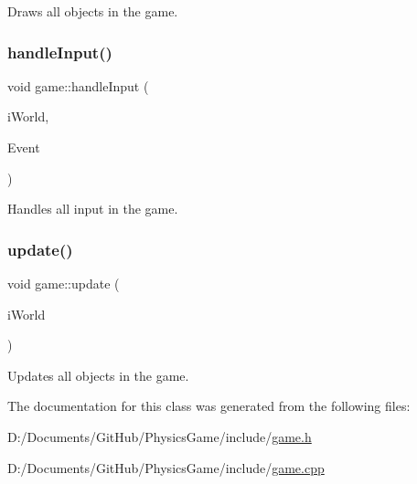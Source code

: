 Draws all objects in the game. 

\mbox{\label{classgame_a9733b814ab29dd4407441c17fa58b187}} 
\subsubsection{\texorpdfstring{handle\+Input()}{handleInput()}}
{\footnotesize\ttfamily void game\+::handle\+Input (\begin{DoxyParamCaption}\item[{b2\+World \&}]{i\+World,  }\item[{sf\+::\+Event \&}]{Event }\end{DoxyParamCaption})\hspace{0.3cm}{\ttfamily [virtual]}}



Handles all input in the game. 

\mbox{\label{classgame_aaac7fea645c92fd364bdccb24d59efd2}} 
\subsubsection{\texorpdfstring{update()}{update()}}
{\footnotesize\ttfamily void game\+::update (\begin{DoxyParamCaption}\item[{b2\+World \&}]{i\+World }\end{DoxyParamCaption})\hspace{0.3cm}{\ttfamily [virtual]}}



Updates all objects in the game. 



The documentation for this class was generated from the following files\+:\begin{DoxyCompactItemize}
\item 
D\+:/\+Documents/\+Git\+Hub/\+Physics\+Game/include/\hyperlink{game_8h}{game.\+h}\item 
D\+:/\+Documents/\+Git\+Hub/\+Physics\+Game/include/\hyperlink{game_8cpp}{game.\+cpp}\end{DoxyCompactItemize}
